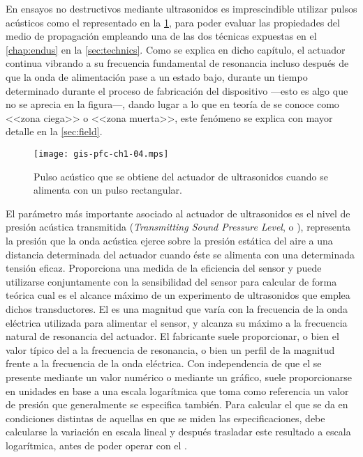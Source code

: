 En ensayos no destructivos mediante ultrasonidos es imprescindible utilizar
pulsos acústicos como el representado en la \cref{fig:pulse}, para poder
evaluar las propiedades del medio de propagación empleando una de las dos
técnicas expuestas en el \cref{chap:endus} en la \cref{sec:technics}. Como
se explica en dicho capítulo, el actuador continua vibrando a su frecuencia
fundamental de resonancia incluso después de que la onda de alimentación
pase a un estado bajo, durante un tiempo determinado durante el proceso de
fabricación del dispositivo ---esto es algo que no se aprecia en la
figura---, dando lugar a lo que en teoría de  se conoce como
<<zona ciega>> o <<zona muerta>>, este fenómeno se explica con mayor
detalle en la \cref{sec:field}.

\begin{figure}
	\begin{center}
		\texttt{[image: gis-pfc-ch1-04.mps]}
	\end{center}
	\caption[Pulso acústico generado por el actuador de
	ultrasonidos]{Pulso acústico que se obtiene del actuador de
	ultrasonidos cuando se alimenta con un pulso rectangular.}
	\label{fig:pulse}
\end{figure}

El parámetro más importante asociado al actuador de ultrasonidos es el
nivel de presión acústica transmitida (\emph{Transmitting Sound Pressure
Level}, o ), representa la presión que la onda acústica ejerce
sobre la presión estática del aire a una distancia determinada del actuador
cuando éste se alimenta con una determinada tensión eficaz. Proporciona una
medida de la eficiencia del sensor y puede utilizarse conjuntamente con la
sensibilidad del sensor para calcular de forma teórica cual es el alcance
máximo de un experimento de ultrasonidos que emplea dichos transductores.
El  es una magnitud que varía con la frecuencia de la onda
eléctrica utilizada para alimentar el sensor, y alcanza su máximo a la
frecuencia natural de resonancia del actuador. El fabricante suele
proporcionar, o bien el valor típico del  a la frecuencia de
resonancia, o bien un perfil de la magnitud frente a la frecuencia de la
onda eléctrica. Con independencia de que el  se presente mediante
un valor numérico o mediante un gráfico, suele proporcionarse en unidades
en base a una escala logarítmica que toma como referencia un valor de
presión que generalmente se especifica también. Para calcular el 
que se da en condiciones distintas de aquellas en que se miden las
especificaciones, debe calcularse la variación en escala lineal y después
trasladar este resultado a escala logarítmica, antes de poder operar con el
.


